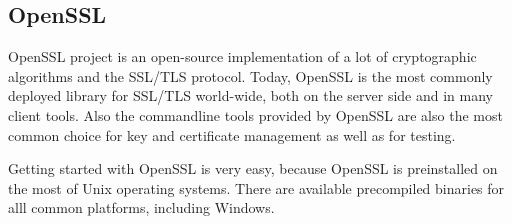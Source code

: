 \subsection{OpenSSL}

OpenSSL project is an open-source implementation of a lot of cryptographic algorithms and the SSL/TLS protocol. Today, OpenSSL is the most commonly deployed library for SSL/TLS world-wide, both on the server side and in many client tools. Also the commandline tools provided by OpenSSL are also the most common choice for key and certificate management as well as for testing.

Getting started with OpenSSL is very easy, because OpenSSL is preinstalled on the most of Unix operating systems. There are available precompiled binaries for alll common platforms, including Windows.
